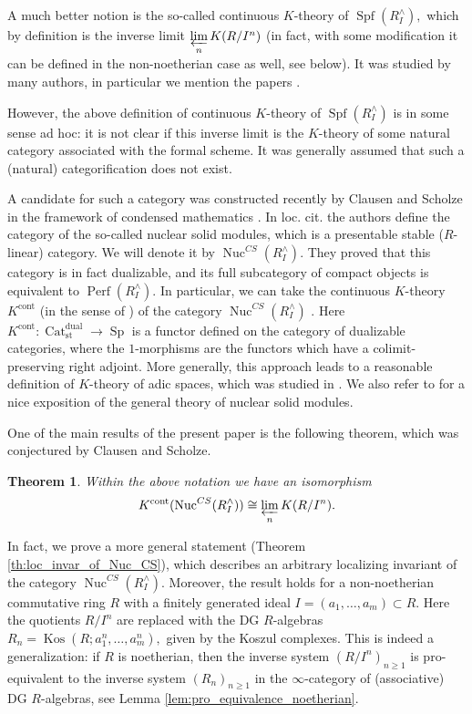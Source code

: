 \documentclass[11pt,leqno]{amsart}
\newtheorem{theo}{Theorem}[section]
\numberwithin{equation}{section}
\newcommand{\prolim}[1][]{\mathop{\varprojlim}\limits_{#1}}
\newcommand{\Nuc}{\operatorname{Nuc}}
\newcommand{\Cat}{\operatorname{Cat}}
\newcommand{\cont}{\operatorname{cont}}
\newcommand{\st}{\operatorname{st}}
\newcommand{\dual}{\operatorname{dual}}
\newcommand{\Perf}{\operatorname{Perf}}
\newcommand{\Kos}{\operatorname{Kos}}
\newcommand{\Sp}{\operatorname{Sp}}
\newcommand{\Spf}{\operatorname{Spf}}
\begin{document}
 A much better notion is the so-called continuous $K$-theory of $\Spf(R^{\wedge}_I),$ which by definition is the inverse limit $\prolim[n]K(R/I^n)$ (in fact, with some modification it can be defined in the non-noetherian case as well, see below). It was studied by many authors, in particular we mention the papers \cite{Wag76, BEK14a, BEK14b, Bei14, Mor18, KST19, KST23}. 
 
 However, the above definition of continuous $K$-theory of $\Spf(R^{\wedge}_I)$ is in some sense ad hoc: it is not clear if this inverse limit is the $K$-theory of some natural category associated with the formal scheme. It was generally assumed that such a (natural) categorification does not exist.
 
 A candidate for such a category was constructed recently by Clausen and Scholze in the framework of condensed mathematics \cite{CS20}. In loc. cit. the authors define the category of the so-called nuclear solid modules, which is a presentable stable ($R$-linear) category. We will denote it by $\Nuc^{CS}(R^{\wedge}_I).$ They proved that this category is in fact dualizable, and its full subcategory of compact objects is equivalent to $\Perf(R^{\wedge}_I).$ In particular, we can take the continuous $K$-theory $K^{\cont}$ (in the sense of \cite{E24}) of the category $\Nuc^{CS}(R^{\wedge}_I)$ . Here $K^{\cont}:\Cat_{\st}^{\dual}\to \Sp$ is a functor defined on the category of dualizable categories, where the $1$-morphisms are the functors which have a colimit-preserving right adjoint. More generally, this approach leads to a reasonable definition of $K$-theory of adic spaces, which was studied in \cite{And23}. We also refer to \cite{AM24} for a nice exposition of the general theory of nuclear solid modules. 
 
 One of the main results of the present paper is the following theorem, which was conjectured by Clausen and Scholze.
 
\begin{theo}\label{th:K_theory_of_Nuc^CS_intro}
Within the above notation we have an isomorphism 
\begin{equation}
 	K^{\cont}(\Nuc^{CS}(R^{\wedge}_I))\cong \prolim[n] K(R/I^n).
\end{equation}
\end{theo}

In fact, we prove a more general statement (Theorem \ref{th:loc_invar_of_Nuc_CS}), which describes an arbitrary localizing invariant of the category $\Nuc^{CS}(R^{\wedge}_I).$ Moreover, the result holds for a non-noetherian commutative ring $R$ with a finitely generated ideal $I=(a_1,\dots,a_m)\subset R.$ Here the quotients $R/I^n$ are replaced with the DG $R$-algebras $R_n=\Kos(R;a_1^n,\dots,a_m^n),$ given by the Koszul complexes. This is indeed a generalization: if $R$ is noetherian, then the inverse system $(R/I^n)_{n\geq 1}$ is pro-equivalent to the inverse system $(R_n)_{n\geq 1}$ in the $\infty$-category of (associative) DG $R$-algebras, see Lemma \ref{lem:pro_equivalence_noetherian}.
 
\end{document}
